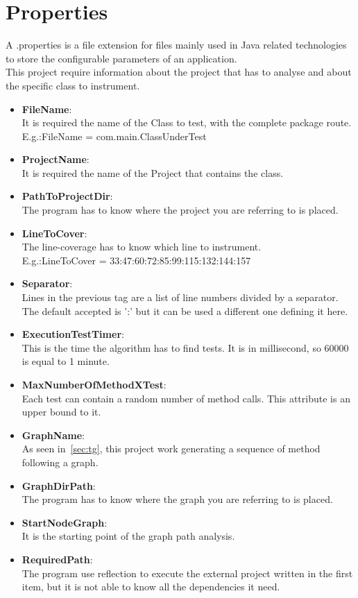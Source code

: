 \section{Properties}\label{sec:prop}
A .properties is a file extension for files mainly used in Java related technologies to store the configurable parameters of an application.\\
This project require information about the project that has to analyse and about the specific class to instrument.
\begin{itemize}
	\item \textbf{FileName}:\\
	It is required the name of the Class to test, with the complete package route.\\
	E.g.:FileName = com.main.ClassUnderTest
	\item \textbf{ProjectName}:\\
	It is required the name of the Project that contains the class.
	\item \textbf{PathToProjectDir}:\\
	The program has to know where the project you are referring to is placed.
	\item \textbf{LineToCover}:\\
	The line-coverage has to know which line to instrument.\\
	E.g.:LineToCover = 33:47:60:72:85:99:115:132:144:157
	\item \textbf{Separator}:\\
	Lines in the previous tag are a list of line numbers divided by a separator.\\
	The default accepted is ':' but it can be used a different one defining it here.
	\item \textbf{ExecutionTestTimer}:\\
	This is the time the algorithm has to find tests.
	It is in millisecond, so 60000 is equal to 1 minute.
	\item \textbf{MaxNumberOfMethodXTest}:\\
	Each test can contain a random number of method calls. This attribute is an upper bound to it.
	\item \textbf{GraphName}:\\
	As seen in~\ref{sec:tg}, this project work generating a sequence of method following a graph.
	\item \textbf{GraphDirPath}:\\
	The program has to know where the graph you are referring to is placed.
	\item \textbf{StartNodeGraph}:\\
	It is the starting point of the graph path analysis.
	\item \textbf{RequiredPath}:\\
	The program use reflection to execute the external project written in the first item, but it is not able to know all the dependencies it need.
\end{itemize}